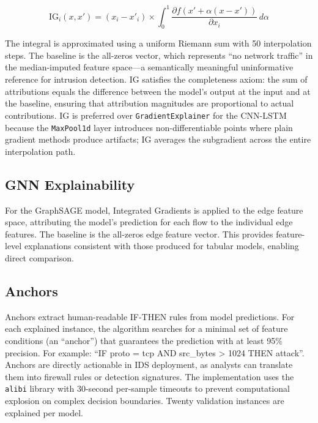 \documentclass[12pt,a4paper]{report}
\begin{document}
\begin{equation}
\label{eq:ig}
\text{IG}_i(x, x') = (x_i - x'_i) \times \int_0^1 \frac{\partial f(x' + \alpha(x - x'))}{\partial x_i} \, d\alpha
\end{equation}

The integral is approximated using a uniform Riemann sum with 50 interpolation steps. The baseline is the all-zeros vector, which represents ``no network traffic'' in the median-imputed feature space---a semantically meaningful uninformative reference for intrusion detection. IG satisfies the completeness axiom: the sum of attributions equals the difference between the model's output at the input and at the baseline, ensuring that attribution magnitudes are proportional to actual contributions. IG is preferred over \texttt{GradientExplainer} for the CNN-LSTM because the \texttt{MaxPool1d} layer introduces non-differentiable points where plain gradient methods produce artifacts; IG averages the subgradient across the entire interpolation path.

\subsection{GNN Explainability}
\label{sec:gnn-xai}

For the GraphSAGE model, Integrated Gradients is applied to the edge feature space, attributing the model's prediction for each flow to the individual edge features. The baseline is the all-zeros edge feature vector. This provides feature-level explanations consistent with those produced for tabular models, enabling direct comparison.

\subsection{Anchors}
\label{sec:anchors}

Anchors \citep{ribeiro2018} extract human-readable IF-THEN rules from model predictions. For each explained instance, the algorithm searches for a minimal set of feature conditions (an ``anchor'') that guarantees the prediction with at least 95\% precision. For example: ``IF proto = tcp AND src\_bytes > 1024 THEN attack''. Anchors are directly actionable in IDS deployment, as analysts can translate them into firewall rules or detection signatures. The implementation uses the \texttt{alibi} library with 30-second per-sample timeouts to prevent computational explosion on complex decision boundaries. Twenty validation instances are explained per model.
\end{document}
